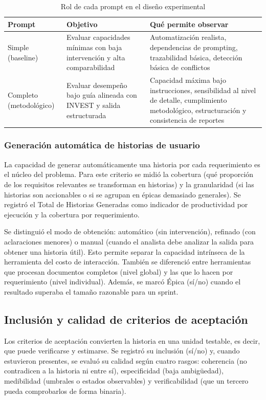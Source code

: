 \begin{table}[h!]
\centering
\caption{Rol de cada prompt en el diseño experimental}
\begin{tabular}{|p{1.5cm} |p{4cm} |p{5cm}|}
\hline
\textbf{Prompt} & \textbf{Objetivo} & \textbf{Qué permite observar} \\
\hline
Simple (baseline) & Evaluar capacidades mínimas con baja intervención y alta comparabilidad & Automatización realista, dependencias de prompting, trazabilidad básica, detección básica de conflictos \\
Completo (metodológico) & Evaluar desempeño bajo guía alineada con INVEST y salida estructurada & Capacidad máxima bajo instrucciones, sensibilidad al nivel de detalle, cumplimiento metodológico, estructuración y consistencia de reportes \\
\hline
\end{tabular}
\end{table}


\subsubsection{Generación automática de historias de usuario}

La capacidad de generar automáticamente una historia por cada requerimiento es el núcleo del problema. Para este criterio se midió la cobertura (qué proporción de los requisitos relevantes se transforman en historias) y la granularidad (si las historias son accionables o si se agrupan en épicas demasiado generales). Se registró el Total de Historias Generadas como indicador de productividad por ejecución y la cobertura por requerimiento. 

Se distinguió el modo de obtención: automático (sin intervención), refinado (con aclaraciones menores) o manual (cuando el analista debe analizar la salida para obtener una historia útil). Esto permite separar la capacidad intrínseca de la herramienta del costo de interacción. También se diferenció entre herramientas que procesan documentos completos (nivel global) y las que lo hacen por requerimiento (nivel individual). Además, se marcó Épica (sí/no) cuando el resultado superaba el tamaño razonable para un sprint.

\subsection{Inclusión y calidad de criterios de aceptación}

Los criterios de aceptación convierten la historia en una unidad testable, es decir, que puede verificarse y estimarse. Se registró su inclusión (sí/no) y, cuando estuvieron presentes, se evaluó su calidad según cuatro rasgos: coherencia (no contradicen a la historia ni entre sí), especificidad (baja ambigüedad), medibilidad (umbrales o estados observables) y verificabilidad (que un tercero pueda comprobarlos de forma binaria).

